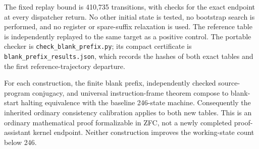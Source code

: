 The fixed replay bound is 410,735 transitions, with checks for the exact
endpoint at every dispatcher return. No other initial state is tested, no
bootstrap search is performed, and no register or spare-suffix relaxation
is used. The reference table is independently replayed to the same target
as a positive control. The portable checker is
\texttt{check\_blank\_prefix.py}; its compact certificate is
\texttt{blank\_prefix\_results.json}, which records the hashes of both exact
tables and the first reference-trajectory departure.

For each construction, the finite blank prefix, independently checked
source-program conjugacy, and universal instruction-frame theorem compose
to blank-start halting equivalence with the baseline 246-state machine.
Consequently the inherited ordinary consistency calibration applies to
both new tables. This is an ordinary mathematical proof formalizable in
ZFC, not a newly completed proof-assistant kernel endpoint. Neither
construction improves the working-state count below 246.
